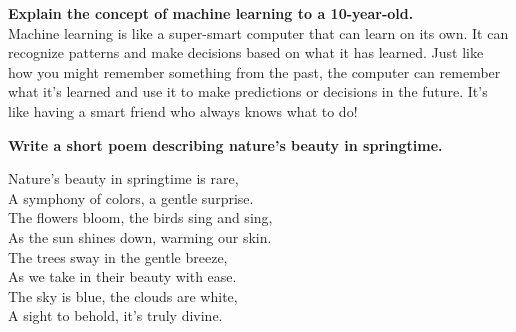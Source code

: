 \documentclass[11pt]{article}
\begin{document}
\begin{tcolorbox}[colback=white,colframe=black!75!black,title=RWKV-4-Raven-14B]
\textbf{Explain the concept of machine learning to a 10-year-old.}\\

Machine learning is like a super-smart computer that can learn on its own. It can recognize patterns and make decisions based on what it has learned. Just like how you might remember something from the past, the computer can remember what it's learned and use it to make predictions or decisions in the future. It's like having a smart friend who always knows what to do!\\
\end{tcolorbox}


\begin{tcolorbox}[colback=white,colframe=black!75!black,title=RWKV-4-Raven-14B]
\textbf{Write a short poem describing nature's beauty in springtime.}\\

\begin{center}
Nature's beauty in springtime is rare,\\
A symphony of colors, a gentle surprise.\\
The flowers bloom, the birds sing and sing,\\
As the sun shines down, warming our skin.\\
The trees sway in the gentle breeze,\\
As we take in their beauty with ease.\\
The sky is blue, the clouds are white,\\
A sight to behold, it's truly divine.\\
\end{center}
\end{tcolorbox}
\end{document}
